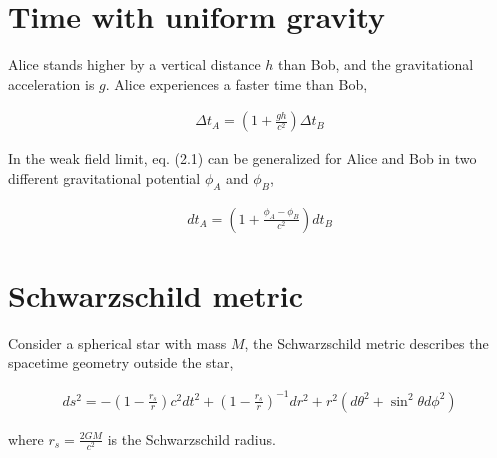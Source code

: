 \documentclass[12pt]{book} %
\numberwithin{equation}{chapter}
\def\D{\Delta}
\begin{document}
\section{Time with uniform gravity}
Alice stands higher by a vertical distance $h$ than Bob, and the gravitational acceleration is $g$. Alice experiences a faster time than Bob,
\begin{eqnbox}
\begin{align}
\D t_{A}=\left(1+\frac{gh}{c^2}\right)\D t_{B}
\end{align}
\end{eqnbox}
In the weak field limit, eq. (2.1) can be generalized for Alice and Bob in two different gravitational potential $\phi_{A}$ and $\phi_{B}$,
\begin{eqnbox}
\begin{align}
dt_{A}=\left(1+\frac{\phi_{A}-\phi_{B}}{c^2}\right)dt_{B}
\end{align}
\end{eqnbox}

\section{Schwarzschild metric}
Consider a spherical star with mass $M$, the Schwarzschild metric describes the spacetime geometry outside the star,
\begin{eqnbox}
\begin{align}
ds^2=-\left(1-\frac{r_{s}}{r}\right)c^2 dt^2+{\left(1-\frac{r_{s}}{r}\right)}^{-1} dr^2+r^2 \left(d\theta^{2}+\sin^{2}\theta d\phi^{2}\right)
\end{align}
\end{eqnbox}
where $r_{s}=\frac{2GM}{c^2}$ is the Schwarzschild radius.
\end{document}
